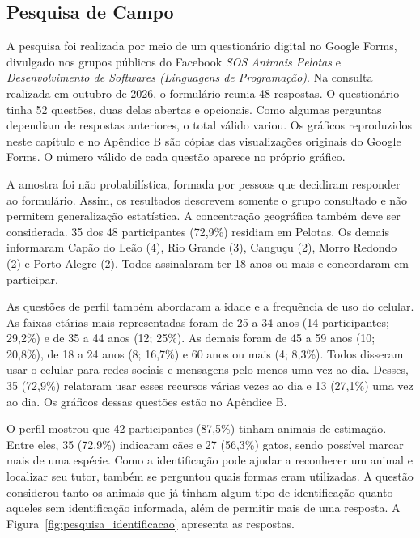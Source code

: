 \subsection{Pesquisa de Campo}

A pesquisa foi realizada por meio de um questionário digital no Google Forms, divulgado nos grupos públicos do Facebook \textit{SOS Animais Pelotas} e \textit{Desenvolvimento de Softwares (Linguagens de Programação)}. Na consulta realizada em outubro de 2026, o formulário reunia 48 respostas. O questionário tinha 52 questões, duas delas abertas e opcionais. Como algumas perguntas dependiam de respostas anteriores, o total válido variou. Os gráficos reproduzidos neste capítulo e no Apêndice B são cópias das visualizações originais do Google Forms. O número válido de cada questão aparece no próprio gráfico.

A amostra foi não probabilística, formada por pessoas que decidiram responder ao formulário. Assim, os resultados descrevem somente o grupo consultado e não permitem generalização estatística. A concentração geográfica também deve ser considerada. 35 dos 48 participantes (72,9\%) residiam em Pelotas. Os demais informaram Capão do Leão (4), Rio Grande (3), Canguçu (2), Morro Redondo (2) e Porto Alegre (2). Todos assinalaram ter 18 anos ou mais e concordaram em participar.

As questões de perfil também abordaram a idade e a frequência de uso do celular. As faixas etárias mais representadas foram de 25 a 34 anos (14 participantes; 29,2\%) e de 35 a 44 anos (12; 25\%). As demais foram de 45 a 59 anos (10; 20,8\%), de 18 a 24 anos (8; 16,7\%) e 60 anos ou mais (4; 8,3\%). Todos disseram usar o celular para redes sociais e mensagens pelo menos uma vez ao dia. Desses, 35 (72,9\%) relataram usar esses recursos várias vezes ao dia e 13 (27,1\%) uma vez ao dia. Os gráficos dessas questões estão no Apêndice B.

\clearpage

O perfil mostrou que 42 participantes (87,5\%) tinham animais de estimação. Entre eles, 35 (72,9\%) indicaram cães e 27 (56,3\%) gatos, sendo possível marcar mais de uma espécie. Como a identificação pode ajudar a reconhecer um animal e localizar seu tutor, também se perguntou quais formas eram utilizadas. A questão considerou tanto os animais que já tinham algum tipo de identificação quanto aqueles sem identificação informada, além de permitir mais de uma resposta. A Figura~\ref{fig:pesquisa_identificacao} apresenta as respostas.


